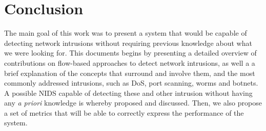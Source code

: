 \documentclass[runningheads,a4paper]{llncs}
\begin{document}
\section{Conclusion}\label{sec:conclusion}

The main goal of this work was to present a system that would be capable of detecting network intrusions without requiring previous knowledge about what we were looking for. This documents begins by presenting a detailed overview of contributions on flow-based approaches to detect network intrusions, as well a a brief explanation of the concepts that surround and involve them, and the most commonly addressed intrusions, such as DoS, port scanning, worms and botnets. A possible NIDS capable of detecting these and other intrusion without having any \textit{a priori} knowledge is whereby proposed and discussed. Then, we also propose a set of metrics that will be able to correctly express the performance of the system.





\end{document}
